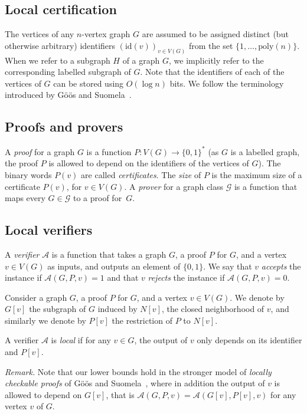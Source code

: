 \documentclass[a4paper,reqno, 12pt]{amsart}
\begin{document}
\subsection{Local certification}\label{sec:defpls}

The vertices of any $n$-vertex
graph $G$ are assumed to be assigned distinct (but otherwise arbitrary)
identifiers $(\text{id}(v))_{v\in V(G)}$ from the set 
$\{1,\ldots,\text{poly}(n)\}$. When we refer to a subgraph $H$ of a graph $G$, we
implicitly refer to the corresponding labelled subgraph of $G$.
Note that the identifiers of each of the vertices of $G$ can be stored
using $O(\log n)$ bits.
We follow the
terminology introduced by G\"o\"os and Suomela~\cite{lcp}.

\subsection*{Proofs and provers} A \emph{proof} for a graph $G$ is a function
$P:V(G)\to \{0,1\}^*$ (as $G$ is a  labelled graph,
the proof $P$ is allowed to depend on the identifiers of the
vertices of $G$). The binary words $P(v)$ are called \emph{certificates}. The \emph{size} of $P$ is the maximum size of a
certificate $P(v)$, for $v\in V(G)$.
A \emph{prover} for a graph class $\mathcal{G}$ is a function that
maps every $G\in \mathcal{G}$ to a proof for~$G$.

\subsection*{Local verifiers} A \emph{verifier} $\mathcal{A}$ is a function that takes a
graph $G$, a proof $P$
for $G$, and a vertex $v\in V(G)$ as inputs, and outputs an element of
$\{0,1\}$. We say that $v$ \emph{accepts} the instance if
$\mathcal{A}(G,P,v)=1$ and that $v$ \emph{rejects} the instance if
$\mathcal{A}(G,P,v)=0$.


Consider a graph $G$, a proof $P$ for $G$, and a
vertex $v\in V(G)$.
We denote by $G[v]$ the
subgraph of
$G$ induced by $N[v]$, the closed neighborhood of $v$, and similarly we denote by $P[v]$ the restriction of $P$ to
$N[v]$.

A verifier $\mathcal{A}$ is \emph{local} if for any $v\in G$, the
output of $v$ only depends on its identifier and $P[v]$.

\smallskip

\noindent \emph{Remark.} Note that our lower bounds hold in the stronger model of \emph{locally
checkable proofs} of G\"o\"os and Suomela~\cite{lcp}, where in
addition the output
of $v$ is allowed to depend on $G[v]$, that is 
$\mathcal{A}(G,P,v)=\mathcal{A}(G[v],P[v],v)$
for any vertex $v$ of $G$.
\end{document}
